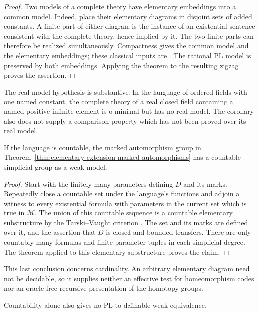 \begin{proof}
Two models of a complete theory have elementary embeddings into a
common model.  Indeed, place their elementary diagrams in disjoint
sets of added constants.  A finite part of either diagram is the
instance of an existential sentence consistent with the complete
theory, hence implied by it.  The two finite parts can therefore be
realized simultaneously.  Compactness gives the common model and
the elementary embeddings; these classical inputs are
\cite[Theorem~2.1.4, pp.~34--35; Lemma~2.3.3, p.~44]{Marker2002ModelTheory}.  The rational PL model is preserved by
both embeddings.  Applying the theorem to the resulting zigzag
proves the assertion.
\end{proof}

The real-model hypothesis is substantive.  In the language of
ordered fields with one named constant, the complete theory of a
real closed field containing a named positive infinite element is
o-minimal but has no real model.  The corollary also does not supply
a comparison property which has not been proved over its real model.

\begin{corollary}\label{cor:countable-definable-automorphism-model}
If the language is countable, the marked automorphism group in
Theorem~\ref{thm:elementary-extension-marked-automorphisms} has a
countable simplicial group as a weak model.
\end{corollary}

\begin{proof}
Start with the finitely many parameters defining $D$ and its marks.
Repeatedly close a countable set under the language's functions and
adjoin a witness to every existential formula with parameters in
the current set which is true in $\mathcal M$.  The union of this
countable sequence is a countable elementary substructure by the
Tarski--Vaught criterion
\cite[Proposition~2.3.5, p.~45]{Marker2002ModelTheory}.  The set and its marks are defined over it,
and the assertion that $D$ is closed and bounded transfers.  There are only
countably many formulas and finite parameter tuples in each
simplicial degree.  The theorem applied to this elementary
substructure proves the claim.
\end{proof}

This last conclusion concerns cardinality.  An arbitrary elementary
diagram need not be decidable, so it supplies neither an effective
test for homeomorphism codes nor an oracle-free recursive
presentation of the homotopy groups.

Countability alone also gives no PL-to-definable weak equivalence.
